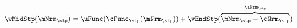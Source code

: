   \begin{equation}\begin{gathered}\begin{aligned}
\vMidStp(\mNrm_{\stp}) & = \uFunc(\cFunc_{\stp}(\mNrm_{\stp})) + \vEndStp(\overbrace{\mNrm_{\stp}-\cNrm_{\stp}}^{\aNrm_{\stp}}) \label{eq:vMidStp}
      \end{aligned}\end{gathered}\end{equation}
